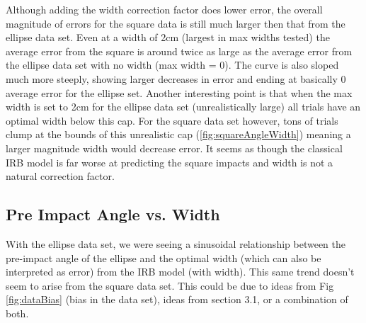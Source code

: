 \documentclass{article}
\begin{document}
\noindent Although adding the width correction factor does lower error, the overall magnitude of errors for the square data is still much larger then that from the ellipse data set. Even at a width of 2cm (largest in max widths tested) the average error from the square is around twice as large as the average error from the ellipse data set with no width (max width = 0). The curve is also sloped much more steeply, showing larger decreases in error and ending at basically 0 average error for the ellipse set. Another interesting point is that when the max width is set to 2cm for the ellipse data set (unrealistically large) all trials have an optimal width below this cap. For the square data set however, tons of trials clump at the bounds of this unrealistic cap (\ref{fig:squareAngleWidth}) meaning a larger magnitude width would decrease error. It seems as though the classical IRB model is far worse at predicting the square impacts and width is not a natural correction factor. 

\subsection{Pre Impact Angle vs. Width}
With the ellipse data set, we were seeing a sinusoidal relationship between the pre-impact angle of the ellipse and the optimal width (which can also be interpreted as error) from the IRB model (with width). This same trend doesn't seem to arise from the square data set.  This could be due to ideas from Fig \ref{fig:dataBias} (bias in the data set), ideas from section 3.1, or a combination of both.   
\end{document}
